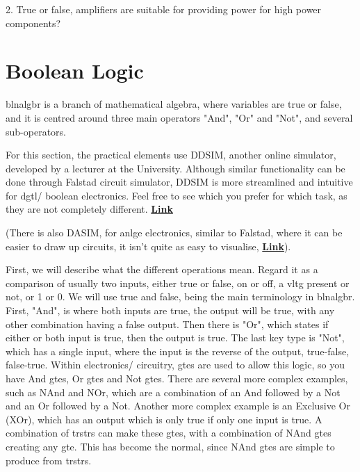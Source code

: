 \documentclass[a4paper,11pt]{report}
\let\oldhref\href %
\renewcommand{\href}[2]{\oldhref{#1}{\bfseries#2}}
\begin{document}
2. True or false, amplifiers are suitable for providing power for high power components?

\pagebreak

\section{Boolean Logic}

\gls{blnalgbr} is a branch of mathematical algebra, where variables are true or false, and it is centred around three main operators "And", "Or" and "Not", and several sub-operators.

For this section, the practical elements use DDSIM, another online simulator, developed by a lecturer at the University. Although similar functionality can be done through Falstad circuit simulator, DDSIM is more streamlined and intuitive for \gls{dgtl}/ boolean electronics. Feel free to see which you prefer for which task, as they are not completely different.
\href{https://www-users.york.ac.uk/~dajp1/Temp/ddsim.html}{Link}

(There is also DASIM, for \gls{anlge} electronics, similar to Falstad, where it can be easier to draw up circuits, it isn't quite as easy to visualise, \href{https://www-users.york.ac.uk/~dajp1/Temp/dasim.html}{Link}).

First, we will describe what the different operations mean. Regard it as a comparison of usually two inputs, either true or false, on or off, a \gls{vltg} present or not, or 1 or 0. We will use true and false, being the main terminology in \gls{blnalgbr}. First, "And", is where both inputs are true, the output will be true, with any other combination having a false output. Then there is "Or", which states if either or both input is true, then the output is true. The last key type is "Not", which has a single input, where the input is the reverse of the output, true-false, false-true. Within electronics/ circuitry, \gls{gte}s are used to allow this logic, so you have And \gls{gte}s, Or \gls{gte}s and Not \gls{gte}s. There are several more complex examples, such as NAnd and NOr, which are a combination of an And followed by a Not and an Or followed by a Not. Another more complex example is an Exclusive Or (XOr), which has an output which is only true if only one input is true. A combination of \gls{trstr}s can make these \gls{gte}s, with a combination of NAnd \gls{gte}s creating any \gls{gte}. This has become the normal, since NAnd \gls{gte}s are simple to produce from \gls{trstr}s.
\end{document}
